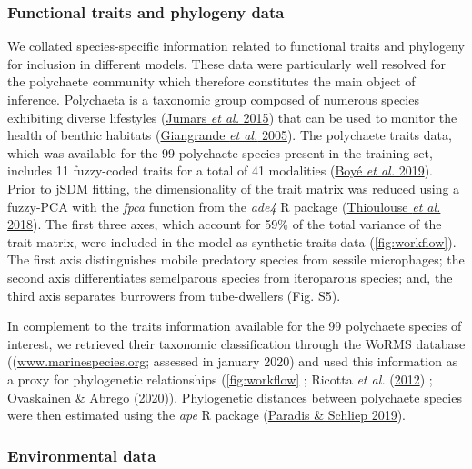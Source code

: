 \documentclass[9pt,biorxiv,doublespacing,lineno]{lapreprint}
\begin{document}
\hypertarget{functional-traits-and-phylogeny-data}{%
\subsubsection{Functional traits and phylogeny
data}\label{functional-traits-and-phylogeny-data}}

We collated species-specific information related to functional traits
and phylogeny for inclusion in different models. These data were
particularly well resolved for the polychaete community which therefore
constitutes the main object of inference. Polychaeta is a taxonomic
group composed of numerous species exhibiting diverse lifestyles
(\protect\hyperlink{ref-Jumars_2015}{Jumars \emph{et al.} 2015}) that
can be used to monitor the health of benthic habitats
(\protect\hyperlink{ref-Giangrande_2005}{Giangrande \emph{et al.}
2005}). The polychaete traits data, which was available for the 99
polychaete species present in the training set, includes 11 fuzzy-coded
traits for a total of 41 modalities
(\protect\hyperlink{ref-Boye_2019a}{Boyé \emph{et al.} 2019}). Prior to
jSDM fitting, the dimensionality of the trait matrix was reduced using a
fuzzy-PCA with the \emph{fpca} function from the \emph{ade4} R package
(\protect\hyperlink{ref-Thioulouse_2018}{Thioulouse \emph{et al.}
2018}). The first three axes, which account for 59\% of the total
variance of the trait matrix, were included in the model as synthetic
traits data (\cref{fig:workflow}). The first axis distinguishes mobile
predatory species from sessile microphages; the second axis
differentiates semelparous species from iteroparous species; and, the
third axis separates burrowers from tube-dwellers (Fig. S5).

In complement to the traits information available for the 99 polychaete
species of interest, we retrieved their taxonomic classification through
the WoRMS database
((\href{https://www.marinespecies.org}{www.marinespecies.org}; assessed
in january 2020) and used this information as a proxy for phylogenetic
relationships (\cref{fig:workflow} ; Ricotta \emph{et al.}
(\protect\hyperlink{ref-Ricotta_2012}{2012}) ; Ovaskainen \& Abrego
(\protect\hyperlink{ref-Ovaskainen_2020}{2020})). Phylogenetic distances
between polychaete species were then estimated using the \emph{ape} R
package (\protect\hyperlink{ref-Paradis_2019}{Paradis \& Schliep 2019}).

\hypertarget{environmental-data}{%
\subsubsection{Environmental data}\label{environmental-data}}
\end{document}
